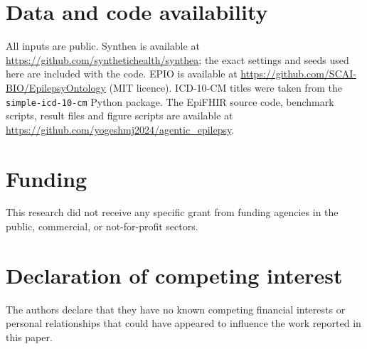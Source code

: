 \documentclass[preprint,12pt]{elsarticle}
\begin{document}
\section*{Data and code availability}
All inputs are public. Synthea is available at \url{https://github.com/synthetichealth/synthea}; the exact settings and seeds used here are included with the code. EPIO is available at \url{https://github.com/SCAI-BIO/EpilepsyOntology} (MIT licence). ICD-10-CM titles were taken from the \texttt{simple-icd-10-cm} Python package. The EpiFHIR source code, benchmark scripts, result files and figure scripts are available at \url{https://github.com/yogeshmj2024/agentic_epilepsy}.

\section*{Funding}
This research did not receive any specific grant from funding agencies in the public, commercial, or not-for-profit sectors.

\section*{Declaration of competing interest}
The authors declare that they have no known competing financial interests or personal relationships that could have appeared to influence the work reported in this paper.



\end{document}
